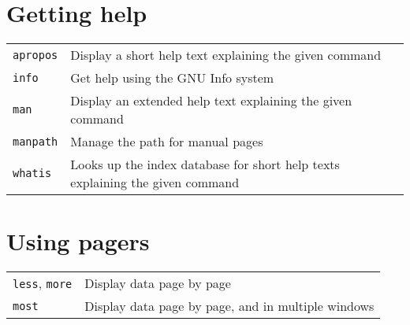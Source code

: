 \documentclass[10pt]{article}
\begin{document}
\begin{multicols}{2}   

\section{Getting help}
\begin{tabular}{ p{2.5cm} p{8.5cm} }
  \hline
  \texttt{apropos} & Display a short help text explaining the given command \\
  \texttt{info} & Get help using the GNU Info system \\
  \texttt{man} & Display an extended help text explaining the given command \\
  \texttt{manpath} & Manage the path for manual pages \\
  \texttt{whatis} & Looks up the index database for short help texts explaining the given command\\
  \hline
\end{tabular}

\section{Using pagers}
\begin{tabular}{ p{2.5cm} p{8.5cm} }
  \hline
  \texttt{less}, \texttt{more} & Display data page by page \\
  \texttt{most} & Display data page by page, and in multiple windows \\
  \hline
\end{tabular}


\end{multicols}
\end{document}

